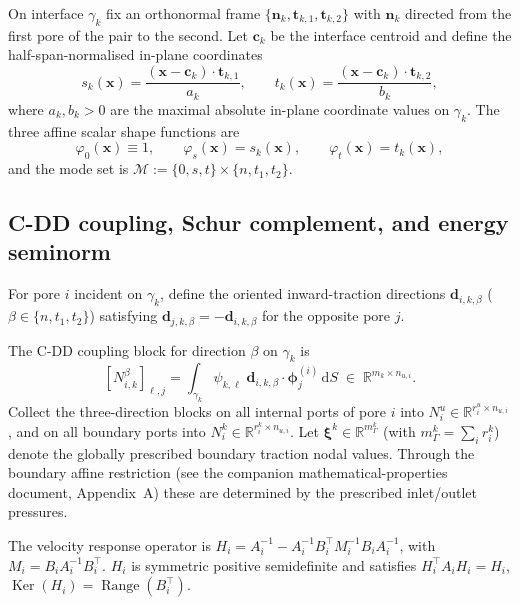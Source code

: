 \documentclass[11pt,a4paper]{article}
\theoremstyle{definition}
\newcommand{\R}{\mathbb{R}}
\newcommand{\iface}{\gamma}
\newcommand{\normal}{\bm{n}}
\newcommand{\Range}{\operatorname{Range}}
\newcommand{\Ker}{\operatorname{Ker}}
\newcommand{\modeset}{\mathcal{M}}
\begin{document}
On interface $\iface_k$ fix an orthonormal frame
$\{\normal_k,\bm{t}_{k,1},\bm{t}_{k,2}\}$ with $\normal_k$ directed
from the first pore of the pair to the second.  Let
$\bm{c}_k$ be the interface centroid and define the half-span-normalised
in-plane coordinates
\begin{equation}\label{eq:st}
  s_k(\bm{x}) = \frac{(\bm{x}-\bm{c}_k)\cdot\bm{t}_{k,1}}{a_k},\qquad
  t_k(\bm{x}) = \frac{(\bm{x}-\bm{c}_k)\cdot\bm{t}_{k,2}}{b_k},
\end{equation}
where $a_k,b_k > 0$ are the maximal absolute in-plane coordinate
values on $\iface_k$.  The three affine scalar shape functions are
\begin{equation}\label{eq:shapes}
  \varphi_0(\bm{x}) \equiv 1,\qquad
  \varphi_s(\bm{x}) = s_k(\bm{x}),\qquad
  \varphi_t(\bm{x}) = t_k(\bm{x}),
\end{equation}
and the mode set is
$\modeset := \{0,s,t\} \times \{n,t_1,t_2\}$.

\subsection{C-DD coupling, Schur complement, and energy seminorm}

For pore $i$ incident on $\iface_k$, define the oriented
inward-traction directions
$\bm{d}_{i,k,\beta}$ ($\beta\in\{n,t_1,t_2\}$) satisfying
$\bm{d}_{j,k,\beta} = -\bm{d}_{i,k,\beta}$ for the opposite pore $j$.

The C-DD coupling block for direction $\beta$ on $\iface_k$ is
\begin{equation}\label{eq:N}
  [N_{i,k}^{\beta}]_{\ell,j}
  = \int_{\iface_k} \psi_{k,\ell}\;
    \bm{d}_{i,k,\beta}\cdot\bm{\phi}_j^{(i)}\,\mathrm{d}S
  \;\in\; \R^{m_k\times n_{u,i}}.
\end{equation}
Collect the three-direction blocks on all internal ports of pore $i$
into $N_i^u \in \R^{r_i^u \times n_{u,i}}$, and on all boundary ports
into $N_i^k \in \R^{r_i^k \times n_{u,i}}$.  Let $\bm{\xi}^k \in
\R^{m_\Gamma^k}$ (with $m_\Gamma^k = \sum_i r_i^k$) denote the
globally prescribed boundary traction nodal values.  Through the
boundary affine restriction (see the companion
mathematical-properties document, Appendix~A) these are determined by
the prescribed inlet/outlet pressures.

The velocity response operator is
$H_i = A_i^{-1} - A_i^{-1}B_i^\top M_i^{-1}B_i A_i^{-1}$,
with $M_i = B_i A_i^{-1}B_i^\top$.
$H_i$ is symmetric positive semidefinite and satisfies
$H_i^\top A_i H_i = H_i$,
$\Ker(H_i) = \Range(B_i^\top)$.
\end{document}
